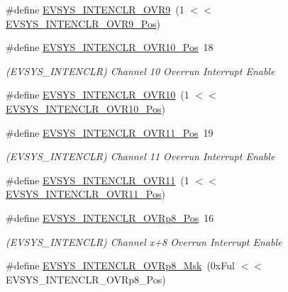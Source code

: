 \begin{DoxyCompactItemize}
\#define \mbox{\hyperlink{group___s_a_m_d21___e_v_s_y_s_gacd906bc8b6041b390a106cae5c498a19}{E\+V\+S\+Y\+S\+\_\+\+I\+N\+T\+E\+N\+C\+L\+R\+\_\+\+O\+V\+R9}}~(1 $<$$<$ \mbox{\hyperlink{group___s_a_m_d21___e_v_s_y_s_ga9cd7b659360c7388a772ac8a9088e072}{E\+V\+S\+Y\+S\+\_\+\+I\+N\+T\+E\+N\+C\+L\+R\+\_\+\+O\+V\+R9\+\_\+\+Pos}})
\item 
\#define \mbox{\hyperlink{group___s_a_m_d21___e_v_s_y_s_ga492a00c2e4600dc0610216b304178769}{E\+V\+S\+Y\+S\+\_\+\+I\+N\+T\+E\+N\+C\+L\+R\+\_\+\+O\+V\+R10\+\_\+\+Pos}}~18
\begin{DoxyCompactList}\small\item\em (E\+V\+S\+Y\+S\+\_\+\+I\+N\+T\+E\+N\+C\+LR) Channel 10 Overrun Interrupt Enable \end{DoxyCompactList}\item 
\#define \mbox{\hyperlink{group___s_a_m_d21___e_v_s_y_s_gaed9b8b7de5e2c17691b20dd871689fd3}{E\+V\+S\+Y\+S\+\_\+\+I\+N\+T\+E\+N\+C\+L\+R\+\_\+\+O\+V\+R10}}~(1 $<$$<$ \mbox{\hyperlink{group___s_a_m_d21___e_v_s_y_s_ga492a00c2e4600dc0610216b304178769}{E\+V\+S\+Y\+S\+\_\+\+I\+N\+T\+E\+N\+C\+L\+R\+\_\+\+O\+V\+R10\+\_\+\+Pos}})
\item 
\#define \mbox{\hyperlink{group___s_a_m_d21___e_v_s_y_s_gae4d678aec0a54c1830bd2005ff082848}{E\+V\+S\+Y\+S\+\_\+\+I\+N\+T\+E\+N\+C\+L\+R\+\_\+\+O\+V\+R11\+\_\+\+Pos}}~19
\begin{DoxyCompactList}\small\item\em (E\+V\+S\+Y\+S\+\_\+\+I\+N\+T\+E\+N\+C\+LR) Channel 11 Overrun Interrupt Enable \end{DoxyCompactList}\item 
\#define \mbox{\hyperlink{group___s_a_m_d21___e_v_s_y_s_gacfa7909a15551e433f7f2cbff5e6ac85}{E\+V\+S\+Y\+S\+\_\+\+I\+N\+T\+E\+N\+C\+L\+R\+\_\+\+O\+V\+R11}}~(1 $<$$<$ \mbox{\hyperlink{group___s_a_m_d21___e_v_s_y_s_gae4d678aec0a54c1830bd2005ff082848}{E\+V\+S\+Y\+S\+\_\+\+I\+N\+T\+E\+N\+C\+L\+R\+\_\+\+O\+V\+R11\+\_\+\+Pos}})
\item 
\#define \mbox{\hyperlink{group___s_a_m_d21___e_v_s_y_s_ga1e4280aa66c9190fb08ffbd40e41e88c}{E\+V\+S\+Y\+S\+\_\+\+I\+N\+T\+E\+N\+C\+L\+R\+\_\+\+O\+V\+Rp8\+\_\+\+Pos}}~16
\begin{DoxyCompactList}\small\item\em (E\+V\+S\+Y\+S\+\_\+\+I\+N\+T\+E\+N\+C\+LR) Channel x+8 Overrun Interrupt Enable \end{DoxyCompactList}\item 
\#define \mbox{\hyperlink{group___s_a_m_d21___e_v_s_y_s_ga06ab6f556646c922b24b17b4fda795b4}{E\+V\+S\+Y\+S\+\_\+\+I\+N\+T\+E\+N\+C\+L\+R\+\_\+\+O\+V\+Rp8\+\_\+\+Msk}}~(0x\+Ful $<$$<$ E\+V\+S\+Y\+S\+\_\+\+I\+N\+T\+E\+N\+C\+L\+R\+\_\+\+O\+V\+Rp8\+\_\+\+Pos)

\end{DoxyCompactItemize}
